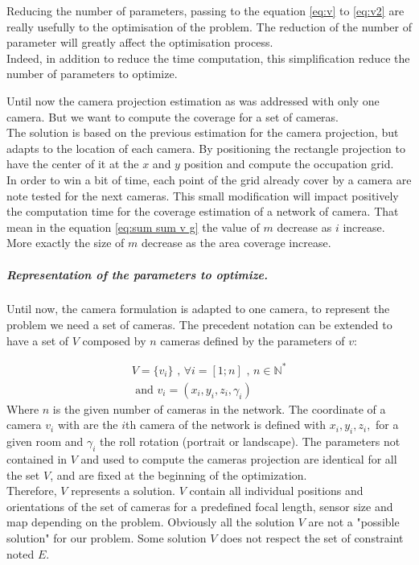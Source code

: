 Reducing the number of  parameters, passing to the equation \ref{eq:v} to \ref{eq:v2} are really usefully to the optimisation of the problem. The reduction of the number of parameter will greatly affect the optimisation process.\\
 Indeed, in addition to reduce the time computation, this simplification reduce the number of parameters to optimize.   

Until now the camera projection estimation as was addressed with only one camera. But we want to compute the coverage for a set of cameras. \\
The solution is based on the previous estimation for the camera projection, but adapts to the location of each camera. By  positioning the rectangle projection to have the center of it at the $x$ and $y$ position and compute the occupation grid.\\

In order to win a bit of time, each point of the grid already cover by a camera are note tested for the next cameras. This small modification will impact positively the computation time for the coverage estimation of a network of camera. That mean in the equation \ref{eq:sum sum v g} the value of $m$ decrease as $i$ increase. More exactly  the size of $m$ decrease as  the area coverage increase.  
\\

\subparagraph{Representation of the parameters to optimize. \\}

Until now, the camera formulation is adapted to one camera, to represent the problem we need a set of cameras. The precedent notation can be extended to have a set of $V$ composed by $n$ cameras defined by the parameters of $v$:

	\begin{equation}\label{eq:V}
		\begin{split}
			V= \{v_i\} \mbox{  , } \forall i=[1;n] \mbox{ , } n\in \mathbb{N}^*
				\\
			\mbox{ and } v_i= (x_i,y_i,z_i,\gamma_i)
		\end{split}
	\end{equation}
\noindent Where $n$ is the given number of cameras in the network. The coordinate of a camera $v_i$ with are the $i$th camera of the network is defined  with $x_i, y_i, z_i,$ for a given room and $\gamma_i$ the roll rotation (portrait or landscape). The parameters not contained in $V$ and used to compute the cameras projection are  identical for all the set $V$, and are fixed at the beginning of the optimization.\\
Therefore, $V$ represents a solution. $V$ contain all individual positions and orientations of the set of cameras for a predefined focal length, sensor size and map depending on the problem.%
Obviously all the solution $V$ are not a "possible solution" for our problem. Some solution $V$ does not respect the set of constraint noted $E$.


